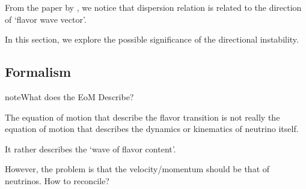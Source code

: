 \documentclass[letterpaper,12pt,english]{sphinxmanual}
\begin{document}
From the paper by \label{\detokenize{collective/directional-instability:id1}}{\hyperref[\detokenize{collective/directional-instability:izaguirre2016}]{\sphinxcrossref{{[}Izaguirre2016{]}}}}, we notice that dispersion relation is related to the direction of `flavor wave vector'.

In this section, we explore the possible significance of the directional instability.


\subsection{Formalism}
\label{\detokenize{collective/directional-instability:formalism}}
\begin{sphinxadmonition}{note}{What does the EoM Describe?}

The equation of motion that describe the flavor transition is not really the equation of motion that describes the dynamics or kinematics of neutrino itself.

It rather describes the `wave of flavor content'.

However, the problem is that the velocity/momentum should be that of neutrinos. How to reconcile?
\end{sphinxadmonition}
\end{document}
